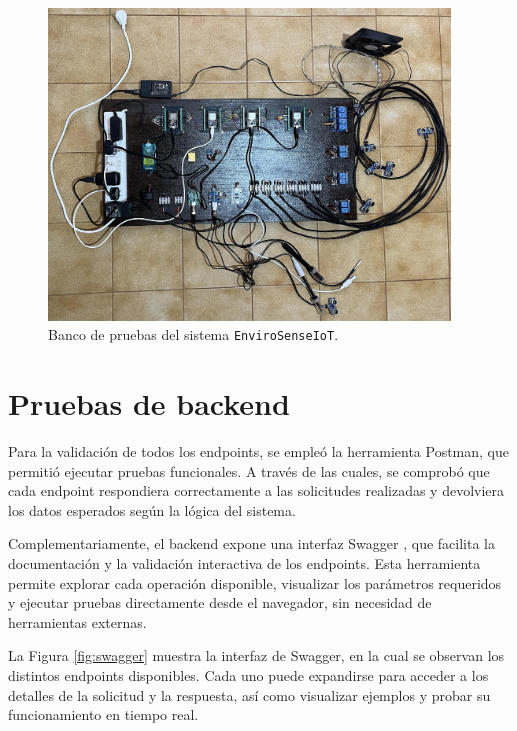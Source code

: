 \begin{figure}[H]
    \centering
    \includegraphics[width=0.95\textwidth]{Images/36_prototipo.jpeg}
    \caption[Banco de pruebas del sistema EnviroSenseIoT]{Banco de pruebas del sistema \texttt{EnviroSenseIoT}.}
    \label{fig:banco_pruebas}
\end{figure}

\section{Pruebas de backend}
\label{sec:pruebas_backend}

Para la validación de todos los endpoints, se empleó la herramienta Postman,
que permitió ejecutar pruebas funcionales. A través de las cuales, se comprobó
que cada endpoint respondiera correctamente a las solicitudes realizadas y
devolviera los datos esperados según la lógica del sistema.

Complementariamente, el backend expone una interfaz Swagger \cite{SwaggerIO},
que facilita la documentación y la validación interactiva de los endpoints.
Esta herramienta permite explorar cada operación disponible, visualizar los
parámetros requeridos y ejecutar pruebas directamente desde el navegador, sin
necesidad de herramientas externas.

La Figura \ref{fig:swagger} muestra la interfaz de Swagger, en la cual se
observan los distintos endpoints disponibles. Cada uno puede expandirse para
acceder a los detalles de la solicitud y la respuesta, así como visualizar
ejemplos y probar su funcionamiento en tiempo real.

